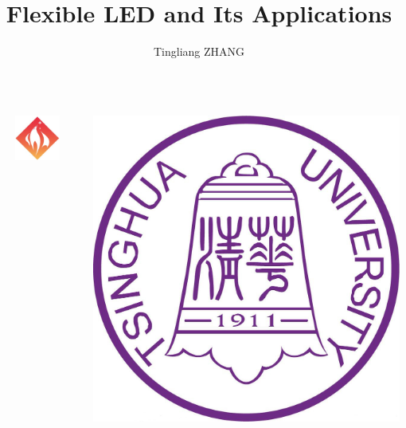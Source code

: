\documentclass[final]{beamer}
\title{%
Flexible LED and Its Applications
}
\author{%
  Tingliang ZHANG\inst{1}%
}
\institute{%
  \inst{1}\utfprname, Beijing, China%
  \par e-mail: \email[1]{zhangtl16@mails.tsinghua.edu.cn}%
}
\date{}%
\begin{document}
\begin{frame}[t, fragile = singleslide]{}

\begin{columns}[t]%

\begin{column}{0.02\textwidth}
\end{column}

\begin{column}{0.18\textwidth}
\flushleft
\includegraphics[width = 0.8\columnwidth]{./Logos/logo-event}%
\end{column}

\begin{column}{0.6\textwidth}
\titlepage
\end{column}

\begin{column}{0.18\textwidth}
\flushright
\includegraphics[width = 0.8\columnwidth]{./Logos/logo-tsinghua}%
\end{column}


\end{columns}
\end{frame}
\end{document}
